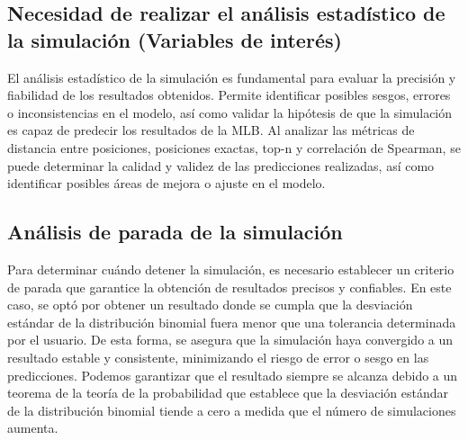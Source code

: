 \documentclass{article}
\begin{document}
            
        \subsection{Necesidad de realizar el análisis estadístico de la simulación (Variables de interés)}
            El análisis estadístico de la simulación es fundamental para evaluar la precisión y fiabilidad de los resultados obtenidos. Permite identificar posibles sesgos, errores o inconsistencias en el modelo, así como validar la hipótesis de que la simulación es capaz de predecir los resultados de la MLB. Al analizar las métricas de distancia entre posiciones, posiciones exactas, top-n y correlación de Spearman, se puede determinar la calidad y validez de las predicciones realizadas, así como identificar posibles áreas de mejora o ajuste en el modelo.

        \subsection{Análisis de parada de la simulación}
            Para determinar cuándo detener la simulación, es necesario establecer un criterio de parada que garantice la obtención de resultados precisos y confiables. En este caso, se optó por obtener un resultado donde se cumpla que la desviación estándar de la distribución binomial fuera menor que una tolerancia determinada por el usuario. De esta forma, se asegura que la simulación haya convergido a un resultado estable y consistente, minimizando el riesgo de error o sesgo en las predicciones. Podemos garantizar que el resultado siempre se alcanza debido a un teorema de la teoría de la probabilidad que establece que la desviación estándar de la distribución binomial tiende a cero a medida que el número de simulaciones aumenta.
\end{document}
